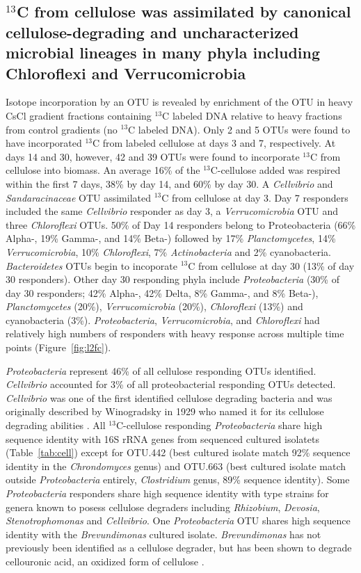 \subsection{$^{13}$C from cellulose was assimilated by canonical
cellulose-degrading and uncharacterized microbial lineages in many phyla
including Chloroflexi and Verrucomicrobia} 
Isotope incorporation by an OTU is revealed by enrichment of the OTU in heavy
CsCl gradient fractions containing $^{13}$C labeled DNA relative to heavy
fractions from control gradients (no $^{13}$C labeled DNA). Only 2 and 5 OTUs
were found to have incorporated $^{13}$C from labeled cellulose at days 3 and
7, respectively. At days 14 and 30, however, 42 and 39
OTUs were found to incorporate $^{13}$C from cellulose into biomass. An average
16\% of the $^{13}$C-cellulose added was respired within the first 7 days, 38\%
by day 14, and 60\% by day 30. A \textit{Cellvibrio} and
\textit{Sandaracinaceae} OTU assimilated $^{13}$C from cellulose at day 3. Day
7 responders included the same \textit{Cellvibrio} responder as day 3, a
\textit{Verrucomicrobia} OTU and three \textit{Chloroflexi} OTUs. 50\% of Day
14 responders belong to Proteobacteria (66\% Alpha-, 19\% Gamma-, and 14\%
Beta-) followed by 17\% \textit{Planctomycetes}, 14\% \textit{Verrucomicrobia},
10\% \textit{Chloroflexi}, 7\% \textit{Actinobacteria} and 2\%
cyanobacteria. \textit{Bacteroidetes} OTUs begin to incoporate
$^{13}$C from cellulose at day 30 (13\% of day 30 responders). Other day 30
responding phyla include \textit{Proteobacteria} (30\% of day 30 responders;
42\% Alpha-, 42\% Delta, 8\% Gamma-, and 8\% Beta-), \textit{Planctomycetes}
(20\%), \textit{Verrucomicrobia} (20\%), \textit{Chloroflexi} (13\%) and
cyanobacteria (3\%). \textit{Proteobacteria},
\textit{Verrucomicrobia}, and \textit{Chloroflexi} had relatively high numbers
of responders with heavy response across multiple time points
(Figure~\ref{fig:l2fc}).

\textit{Proteobacteria} represent 46\% of all cellulose responding OTUs
identified. \textit{Cellvibrio} accounted for 3\% of all proteobacterial
responding OTUs detected. \textit{Cellvibrio} was one of the first identified
cellulose degrading bacteria and was originally described by Winogradsky in
1929 who named it for its cellulose degrading abilities
\citep{boone2001bergeys}. All $^{13}$C-cellulose responding
\textit{Proteobacteria} share high sequence identity with 16S rRNA genes from
sequenced cultured isolatets (Table~\ref{tab:cell}) except for OTU.442 (best cultured
isolate match 92\% sequence identity in the \textit{Chrondomyces} genus) and
OTU.663 (best cultured isolate match outside \textit{Proteobacteria} entirely,
\textit{Clostridium} genus, 89\% sequence identity). Some
\textit{Proteobacteria} responders share high sequence identity with type
strains for genera known to posess cellulose degraders including
\textit{Rhizobium}, \textit{Devosia}, \textit{Stenotrophomonas} and
\textit{Cellvibrio}. One \textit{Proteobacteria} OTU shares high sequence
identity with the \textit{Brevundimonas} cultured isolate.
\textit{Brevundimonas} has not previously been identified as a cellulose
degrader, but has been shown to degrade cellouronic acid, an oxidized form of
cellulose \citep{Tavernier_2008}.

